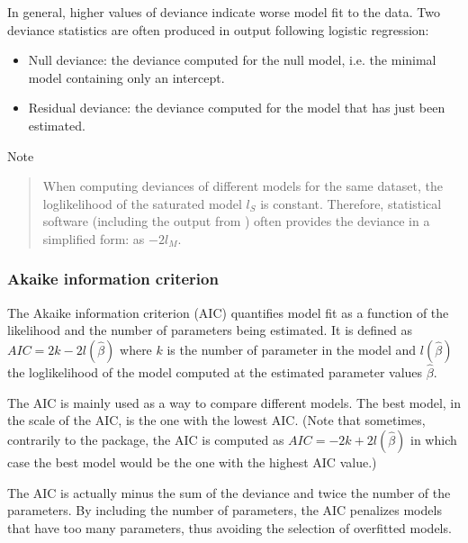 \documentclass[letterpaper,10pt,english]{jupyterBook}
\begin{document}
\sphinxAtStartPar
In general, higher values of deviance indicate worse model fit to the data. Two deviance statistics are often produced in output following logistic regression:
\begin{itemize}
\item {} 
\sphinxAtStartPar
Null deviance: the deviance computed for the null model, i.e. the minimal model containing only an intercept.

\item {} 
\sphinxAtStartPar
Residual deviance: the deviance computed for the model that has just been estimated.

\end{itemize}

\sphinxAtStartPar
Note
\begin{quote}

\sphinxAtStartPar
When computing deviances of different models for the same dataset, the log\sphinxhyphen{}likelihood of the saturated model \(l_S\) is constant. Therefore, statistical software (including the output from ) often provides the deviance in a simplified form: as \(-2 l_M\).
\end{quote}


\subsubsection{Akaike information criterion}
\label{\detokenize{15.j. Logistic Regression:akaike-information-criterion}}
\sphinxAtStartPar
The Akaike information criterion (AIC) quantifies model fit as a function of the likelihood and the number of parameters being estimated. It is defined as \(AIC = 2k - 2 l(\hat{\beta})\) where \(k\) is the number of parameter in the model and \(l(\hat{\beta})\) the log\sphinxhyphen{}likelihood of the model computed at the estimated parameter values \(\hat{\beta}\).

\sphinxAtStartPar
The AIC is mainly used as a way to compare different models. The best model, in the scale of the AIC, is the one with the lowest AIC. (Note that sometimes, contrarily to the  package, the AIC is computed as \(AIC = -2k + 2l(\hat{\beta})\) in which case the best model would be the one with the highest AIC value.)

\sphinxAtStartPar
The AIC is actually minus the sum of the deviance and twice the number of the parameters. By including the number of parameters, the AIC penalizes models that have too many parameters, thus avoiding the selection of overfitted models.
\end{document}
